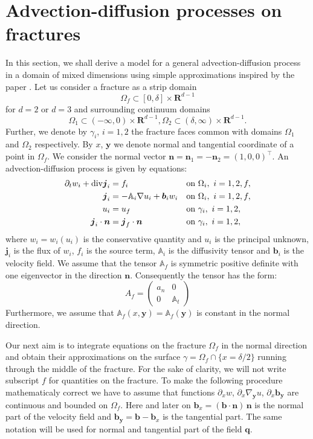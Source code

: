 \documentclass[12pt,a4paper]{report}
\def\prtl{\partial}
\def\vc#1{\mathbf{\boldsymbol{#1}}}     %
\def\tn#1{{\mathbb{#1}}}    %
\def\div{{\rm div}}
\def\grad{\nabla}
\def\Real{{\mathbf R}}
\begin{document}
\section{Advection-diffusion processes on fractures}
\label{sc:ad_on_fractures}
In this section, we shall derive a model for a general advection-diffusion process in a domain of mixed dimensions using
simple approximations inspired by the paper \citet{martin_modeling_2005}. Let us consider a fracture as a strip domain 
\[
 \Omega_f \subset [0,\delta] \times \Real^{d-1}
\]
for $d=2$ or $d=3$ and surrounding continuum domains
\[
 \Omega_1 \subset (-\infty,0)\times \Real^{d-1},
 \Omega_2 \subset (\delta,\infty)\times \Real^{d-1}.
\]
Further, we denote by $\gamma_i$, $i=1,2$ the fracture faces common with domains $\Omega_1$ and $\Omega_2$ respectively.
By $x$, $\vc y$ we denote normal and tangential coordinate of a point in $\Omega_f$. 
We consider the normal vector  $\vc n=\vc n_1=-\vc n_2=(1,0,0)^\top$.
An advection-diffusion process is given by equations:
\begin{align}
  \label{eq:fr:continuity}
  \prtl_t w_i + \div \vc j_i &= f_i&&  \text{on } \Omega_i,\ i=1,2,f,\\
  \label{eq:fr:flux}
  \vc j_i &= - \tn A_i\grad u_i + \vc b_i w_i&& \text{on } \Omega_i,\ i=1,2,f,\\
  \label{eq:fr:Dirichlet}
  u_i &= u_f&& \text{on } \gamma_i,\ i=1,2,\\
  \label{eq:fr:Neumann}
  \vc j_i \cdot \vc n &= \vc j_f \cdot \vc n&& \text{on } \gamma_i,\ i=1,2,
\end{align}
where $w_i=w_i(u_i)$ is the conservative quantity and $u_i$ is the principal unknown, $\vc j_i$ is the flux of $w_i$, $f_i$ is the source term,
$\tn A_i$ is the diffusivity tensor and $\vc b_i$ is the velocity field. We assume that the tensor $\tn A_f$ is symmetric positive definite 
with one eigenvector in the direction $\vc n$. Consequently the tensor has the form:
\[
 A_f = \begin{pmatrix} 
            a_n & 0  \\
            0 & \tn A_t
       \end{pmatrix}
\]
Furthermore, we assume that $\tn A_f(x, \vc y)=\tn A_f(\vc y)$ is constant in the normal direction.

Our next aim is to integrate equations on the fracture $\Omega_f$ in the normal direction 
and obtain their approximations on the surface $\gamma=\Omega_f \cap \{x=\delta/2\}$ running through the middle of the fracture. 
For the sake of clarity, we will not write subscript $f$ for quantities on the fracture. 
To make the following procedure mathematicaly correct we have to assume that functions
$\prtl_x w$, $\prtl_x \grad_{\vc y} u$, $\prtl_x \vc b_{\vc y}$ are continuous and bounded on $\Omega_f$. Here and later on 
$\vc b_x=(\vc b \cdot \vc n)\, \vc n$ is the normal part of the velocity field and $\vc b_{\vc y} = \vc b - \vc b_x$ is the tangential part.
The same notation will be used for normal and tangential part of the field $\vc q$.
\end{document}
